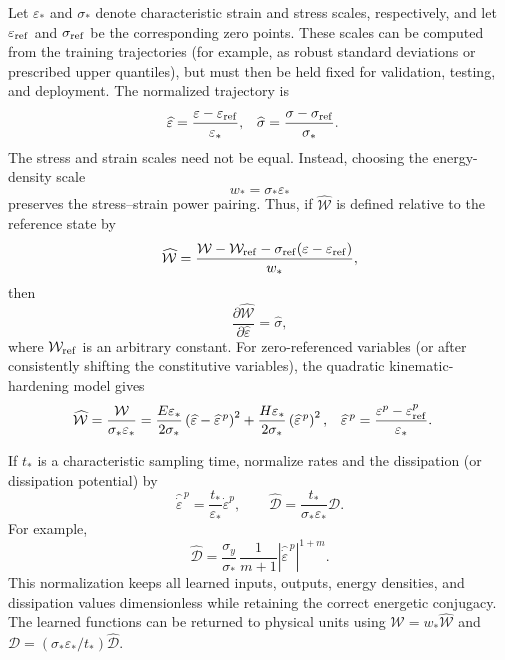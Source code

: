 \documentclass[11pt]{article}
\begin{document}
Let $\varepsilon_*$ and $\sigma_*$ denote characteristic strain and stress
scales, respectively, and let $\varepsilon_{\rm ref}$ and
$\sigma_{\rm ref}$ be the corresponding zero points.  These scales can be
computed from the training trajectories (for example, as robust standard
deviations or prescribed upper quantiles), but must then be held fixed for
validation, testing, and deployment.  The normalized trajectory is
\begin{align}
    \widehat{\varepsilon}
      &= \frac{\varepsilon-\varepsilon_{\rm ref}}{\varepsilon_*},
    &
    \widehat{\sigma}
      &= \frac{\sigma-\sigma_{\rm ref}}{\sigma_*}.
\end{align}
The stress and strain scales need not be equal.  Instead, choosing the
energy-density scale
\begin{equation}
    w_*=\sigma_*\varepsilon_*
\end{equation}
preserves the stress--strain power pairing.  Thus, if
$\widehat{\mathcal{W}}$ is defined relative to the reference state by
\begin{equation}
    \widehat{\mathcal{W}}
    =\frac{\mathcal{W}-\mathcal{W}_{\rm ref}
      -\sigma_{\rm ref}(\varepsilon-\varepsilon_{\rm ref})}{w_*},
\end{equation}
then
\begin{equation}
    \frac{\partial\widehat{\mathcal{W}}}
         {\partial\widehat{\varepsilon}}
    =\widehat{\sigma},
\end{equation}
where $\mathcal{W}_{\rm ref}$ is an arbitrary constant.  For
zero-referenced variables (or after consistently shifting the constitutive
variables), the quadratic kinematic-hardening model gives
\begin{align}
    \widehat{\mathcal{W}}
    &=\frac{\mathcal{W}}{\sigma_*\varepsilon_*}
      =\frac{E\varepsilon_*}{2\sigma_*}
       \left(\widehat{\varepsilon}
             -\widehat{\varepsilon}^{\,p}\right)^2
       +\frac{H\varepsilon_*}{2\sigma_*}
        \left(\widehat{\varepsilon}^{\,p}\right)^2,
    &
    \widehat{\varepsilon}^{\,p}
    &=\frac{\varepsilon^p-\varepsilon^p_{\rm ref}}{\varepsilon_*}.
\end{align}

If $t_*$ is a characteristic sampling time, normalize rates and the
dissipation (or dissipation potential) by
\begin{equation}
    \widehat{\dot{\varepsilon}}^{\,p}
      =\frac{t_*}{\varepsilon_*}\dot{\varepsilon}^{p},
    \qquad
    \widehat{\mathcal{D}}
      =\frac{t_*}{\sigma_*\varepsilon_*}\mathcal{D}.
\end{equation}
For example,
\begin{equation}
    \widehat{\mathcal{D}}
    =\frac{\sigma_y}{\sigma_*}\,
      \frac{1}{m+1}
      \left|\widehat{\dot{\varepsilon}}^{\,p}\right|^{1+m}.
\end{equation}
This normalization keeps all learned inputs, outputs, energy densities, and
dissipation values dimensionless while retaining the correct energetic
conjugacy.  The learned functions can be returned to physical units using
$\mathcal{W}=w_*\widehat{\mathcal{W}}$ and
$\mathcal{D}=(\sigma_*\varepsilon_*/t_*)\widehat{\mathcal{D}}$.
\end{document}
